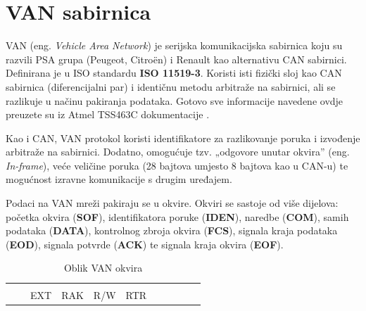 \newpage
\section{VAN sabirnica}\label{sec:van_bus}

VAN (eng. \textit{Vehicle Area Network}) je serijska komunikacijska sabirnica koju su razvili PSA grupa (Peugeot, Citroën) i Renault kao alternativu CAN sabirnici. 
Definirana je u ISO standardu \textbf{ISO 11519-3}. 
Koristi isti fizički sloj kao CAN sabirnica (diferencijalni par) i identičnu metodu arbitraže na sabirnici, 
ali se razlikuje u načinu pakiranja podataka.
Gotovo sve informacije navedene ovdje preuzete su iz Atmel TSS463C dokumentacije \cite{tss463c_datasheet}.

\bigskip
\noindent
Kao i CAN, VAN protokol koristi identifikatore za razlikovanje poruka i izvođenje arbitraže na sabirnici. 
Dodatno, omogućuje tzv. „odgovore unutar okvira” (eng. \textit{In-frame}), veće veličine poruka (28 bajtova umjesto 8 bajtova kao u CAN-u) 
te mogućnost izravne komunikacije s drugim uređajem.

\bigskip
\noindent
Podaci na VAN mreži pakiraju se u okvire. 
Okviri se sastoje od više dijelova: početka okvira (\textbf{SOF}), identifikatora poruke (\textbf{IDEN}), 
naredbe (\textbf{COM}), samih podataka (\textbf{DATA}), kontrolnog zbroja okvira (\textbf{FCS}), 
signala kraja podataka (\textbf{EOD}), signala potvrde (\textbf{ACK}) te signala kraja okvira (\textbf{EOF}).

\begin{table}[H]
    \centering
    \fontsize{10}{10}
    \selectfont
    \begin{tabular}{|c|c|c|c|c|c|c|c|c|c|c|}
        \hline
          &  &  &  &  &  &  &  \\[7mm] 
         &  & EXT & RAK & R/W & RTR &  &  &  &  & \\
        \hline
    \end{tabular}
    \caption{Oblik VAN okvira}
    \label{fig:van_frame_format}
\end{table}

